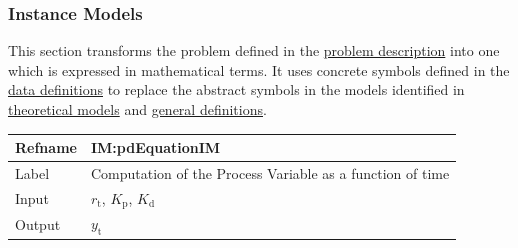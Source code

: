 \documentclass[12pt]{article}
\begin{document}
\subsubsection{Instance Models}
\label{Sec:IMs}
This section transforms the problem defined in the \hyperref[Sec:ProbDesc]{problem description} into one which is expressed in mathematical terms. It uses concrete symbols defined in the \hyperref[Sec:DDs]{data definitions} to replace the abstract symbols in the models identified in \hyperref[Sec:TMs]{theoretical models} and \hyperref[Sec:GDs]{general definitions}.

\medskip
\noindent
\begin{minipage}{\textwidth}
\begin{tabular}{>{\raggedright}p{}>{\raggedright\arraybackslash}p{}}
\toprule \textbf{Refname} & \textbf{IM:pdEquationIM}
\label{IM:pdEquationIM}
\\ \midrule
Label & Computation of the Process Variable as a function of time
        
\\ \midrule
Input & ${r_{\text{t}}}$, ${K_{\text{p}}}$, ${K_{\text{d}}}$
        
\\ \midrule
Output & ${y_{\text{t}}}$
         

\end{tabular}
\end{minipage}
\end{document}
